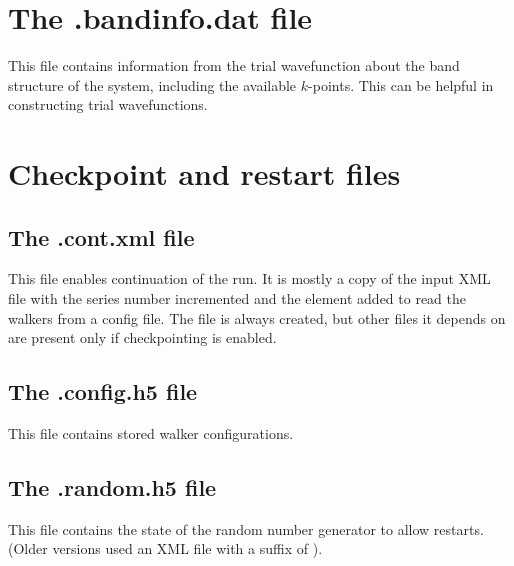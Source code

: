 \section{The .bandinfo.dat file}
\label{sec:bandinfo_file}
This file contains information from the trial wavefunction about the band structure of the system,
including the available $k$-points. This can
be helpful in constructing trial wavefunctions.


\section{Checkpoint and restart files}
\label{sec:checkpoint_files}
\subsection{The .cont.xml file}
This file enables continuation of the run.  It is mostly a copy of the input XML file with the series number incremented and the  element added to read the walkers from a config file.   The  file is always created, but other files it depends on are  present only if checkpointing is enabled.

\subsection{The .config.h5 file}
This file contains stored walker configurations.

\subsection{The .random.h5 file}
This file contains the state of the random number generator to allow restarts.
(Older versions used an XML file with a suffix of ).

